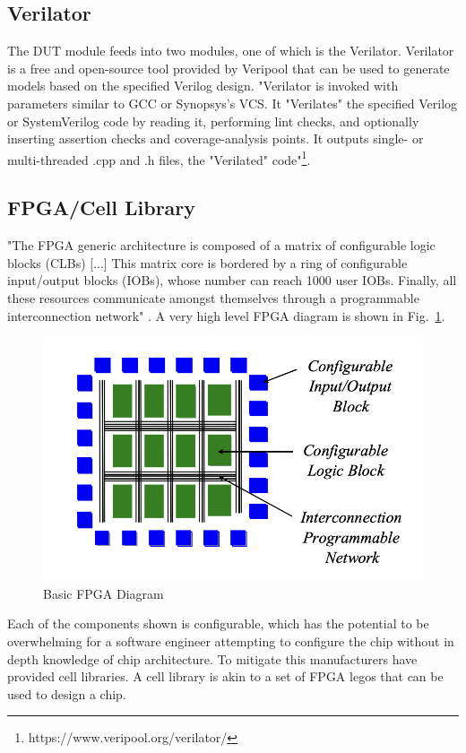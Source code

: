\documentclass[conference]{IEEEtran}
\begin{document}
\subsection{Verilator}
The DUT module feeds into two modules, one of which is the Verilator. Verilator is a free and open-source tool provided by Veripool that can be used to generate models based on the specified Verilog design. "Verilator is invoked with parameters similar to GCC or Synopsys's VCS. It "Verilates" the specified Verilog or SystemVerilog code by reading it, performing lint checks, and optionally inserting assertion checks and coverage-analysis points. It outputs single- or multi-threaded .cpp and .h files, the "Verilated" code"\footnote{https://www.veripool.org/verilator/}.

\subsection{FPGA/Cell Library}
"The FPGA generic architecture is composed of a matrix of configurable logic blocks (CLBs) [...] This matrix core is bordered by a ring of configurable input/output blocks (IOBs), whose number can reach 1000 user IOBs. Finally, all these resources communicate amongst themselves through a programmable interconnection network" \cite{b4}. A very high level FPGA diagram is shown in Fig.~\ref{fpga}.

\begin{figure}[htbp]
\centerline{\includegraphics[width=\linewidth]{./images/fpga.png}}
\caption{Basic FPGA Diagram \cite{b4}}
\label{fpga}
\end{figure}

Each of the components shown is configurable, which has the potential to be overwhelming for a software engineer attempting to configure the chip without in depth knowledge of chip architecture. To mitigate this \cite{b4} manufacturers have provided cell libraries. A cell library is akin to a set of FPGA legos that can be used to design a chip.
\end{document}
